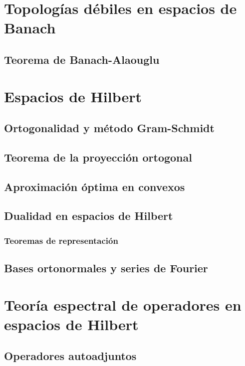 \documentclass[bibnumbers, palatino]{apuntes}
\begin{document}
\chapter{Topologías débiles en espacios de Banach}

\section{Teorema de Banach-Alaouglu}

\chapter{Espacios de Hilbert}

\section{Ortogonalidad y método Gram-Schmidt}

\section{Teorema de la proyección ortogonal}

\section{Aproximación óptima en convexos}

\section{Dualidad en espacios de Hilbert}

\subsection{Teoremas de representación}

\section{Bases ortonormales y series de Fourier}

\chapter{Teoría espectral de operadores en espacios de Hilbert}

\section{Operadores autoadjuntos}
\end{document}
